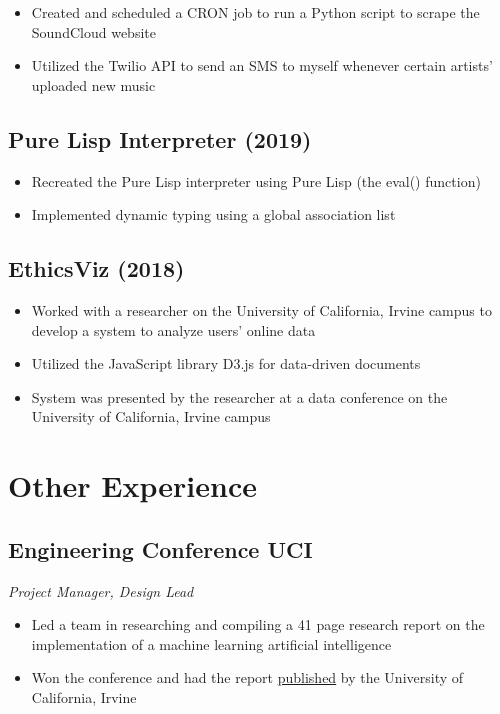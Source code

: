 \documentclass[10pt]{article}
\begin{document}
\begin{itemize}
	\setlength\itemsep{0em}
	\item Created and scheduled a CRON job to run a Python script to scrape the SoundCloud website
	\item Utilized the Twilio API to send an SMS to myself whenever certain artists' uploaded new music
\end{itemize}

\subsection{Pure Lisp Interpreter (2019)}

\begin{itemize}
	\setlength\itemsep{0em}
	\item Recreated the Pure Lisp interpreter using Pure Lisp (the eval() function)
	\item Implemented dynamic typing using a global association list
\end{itemize}

\subsection{EthicsViz (2018)}

\begin{itemize}
	\setlength\itemsep{0em}
	\item Worked with a researcher on the University of California, Irvine campus to develop a system to analyze users' online data
	\item Utilized the JavaScript library D3.js for data-driven documents
	\item System was presented by the researcher at a data conference on the University of California, Irvine campus
\end{itemize}
\section{Other Experience}

\subsection{Engineering Conference UCI}

\noindent\textit{Project Manager, Design Lead}

\begin{itemize}
	\setlength\itemsep{0em}
	\item Led a team in researching and compiling a 41 page research report on the implementation of a machine learning artificial intelligence
	\item Won the conference and had the report \href{https://escholarship.org/uc/item/3hm5q8b8}{published} by the University of California, Irvine
\end{itemize}
\end{document}
